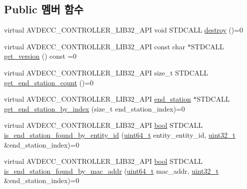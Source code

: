 \subsection*{Public 멤버 함수}
\begin{DoxyCompactItemize}
\item 
virtual A\+V\+D\+E\+C\+C\+\_\+\+C\+O\+N\+T\+R\+O\+L\+L\+E\+R\+\_\+\+L\+I\+B32\+\_\+\+A\+PI void S\+T\+D\+C\+A\+LL \hyperlink{classavdecc__lib_1_1controller_a3fb39895d6d015a25c95b846a3f9bdc0}{destroy} ()=0
\item 
virtual A\+V\+D\+E\+C\+C\+\_\+\+C\+O\+N\+T\+R\+O\+L\+L\+E\+R\+\_\+\+L\+I\+B32\+\_\+\+A\+PI const char $\ast$S\+T\+D\+C\+A\+LL \hyperlink{classavdecc__lib_1_1controller_afd83c80ffa0341e28db7af8c3c257532}{get\+\_\+version} () const =0
\item 
virtual A\+V\+D\+E\+C\+C\+\_\+\+C\+O\+N\+T\+R\+O\+L\+L\+E\+R\+\_\+\+L\+I\+B32\+\_\+\+A\+PI size\+\_\+t S\+T\+D\+C\+A\+LL \hyperlink{classavdecc__lib_1_1controller_ab5ddf7b4a9718fe3e821289141f44485}{get\+\_\+end\+\_\+station\+\_\+count} ()=0
\item 
virtual A\+V\+D\+E\+C\+C\+\_\+\+C\+O\+N\+T\+R\+O\+L\+L\+E\+R\+\_\+\+L\+I\+B32\+\_\+\+A\+PI \hyperlink{classavdecc__lib_1_1end__station}{end\+\_\+station} $\ast$S\+T\+D\+C\+A\+LL \hyperlink{classavdecc__lib_1_1controller_a2a8ec1205ea0d5fdd6f833285257d0d0}{get\+\_\+end\+\_\+station\+\_\+by\+\_\+index} (size\+\_\+t end\+\_\+station\+\_\+index)=0
\item 
virtual A\+V\+D\+E\+C\+C\+\_\+\+C\+O\+N\+T\+R\+O\+L\+L\+E\+R\+\_\+\+L\+I\+B32\+\_\+\+A\+PI \hyperlink{avb__gptp_8h_af6a258d8f3ee5206d682d799316314b1}{bool} S\+T\+D\+C\+A\+LL \hyperlink{classavdecc__lib_1_1controller_a4d07245e54460e0656f7a11bbeaec275}{is\+\_\+end\+\_\+station\+\_\+found\+\_\+by\+\_\+entity\+\_\+id} (\hyperlink{parse_8c_aec6fcb673ff035718c238c8c9d544c47}{uint64\+\_\+t} entity\+\_\+entity\+\_\+id, \hyperlink{parse_8c_a6eb1e68cc391dd753bc8ce896dbb8315}{uint32\+\_\+t} \&end\+\_\+station\+\_\+index)=0
\item 
virtual A\+V\+D\+E\+C\+C\+\_\+\+C\+O\+N\+T\+R\+O\+L\+L\+E\+R\+\_\+\+L\+I\+B32\+\_\+\+A\+PI \hyperlink{avb__gptp_8h_af6a258d8f3ee5206d682d799316314b1}{bool} S\+T\+D\+C\+A\+LL \hyperlink{classavdecc__lib_1_1controller_a79ff05df0c77b9dadc72112546400b69}{is\+\_\+end\+\_\+station\+\_\+found\+\_\+by\+\_\+mac\+\_\+addr} (\hyperlink{parse_8c_aec6fcb673ff035718c238c8c9d544c47}{uint64\+\_\+t} mac\+\_\+addr, \hyperlink{parse_8c_a6eb1e68cc391dd753bc8ce896dbb8315}{uint32\+\_\+t} \&end\+\_\+station\+\_\+index)=0
\item 

\end{DoxyCompactItemize}
